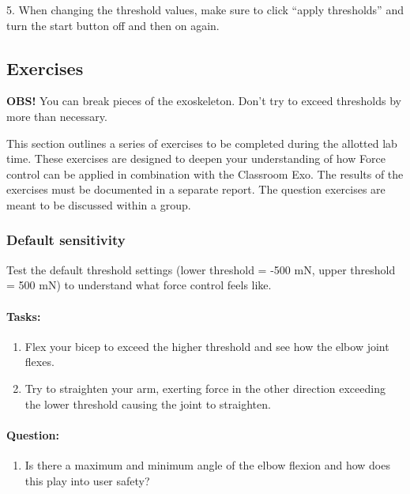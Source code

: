 5.	When changing the threshold values, make sure to click “apply thresholds” and turn the start button off and then on again. 


\newpage
\subsection{Exercises}

\begin{tcolorbox}[colback=red!5!white,colframe=red!75!black,title=Attention]
	\textbf{OBS!} You can break pieces of the exoskeleton. Don’t try to exceed thresholds by more than necessary.
\end{tcolorbox}
\vspace{0.5cm}



This section outlines a series of exercises to be completed during the allotted lab time. These exercises are designed to deepen your understanding of how Force control can be applied in combination with the Classroom Exo. The results of the exercises must be documented in a separate report. The question exercises are meant to be discussed within a group.

\subsubsection{Default sensitivity}

Test the default threshold settings (lower threshold = -500 mN, upper threshold = 500 mN) to understand what force control feels like. 

\paragraph{Tasks:}
\begin{enumerate}[]
	\item Flex your bicep to exceed the higher threshold and see how the elbow joint flexes. 
	\item Try to straighten your arm, exerting force in the other direction exceeding the lower threshold causing the joint to straighten. 
\end{enumerate}
	
\paragraph{Question:} 	
\begin{enumerate}[]
	\item Is there a maximum and minimum angle of the elbow flexion and how does this play into user safety?
\end{enumerate}
 
